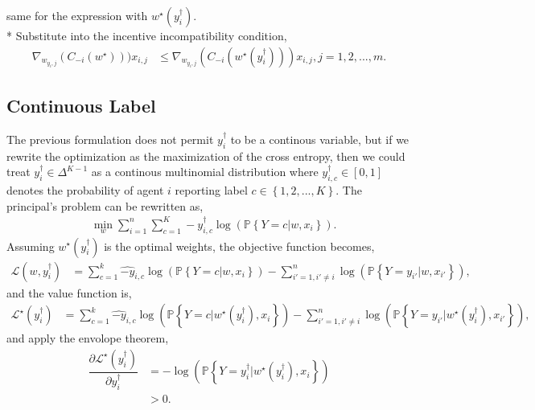 \documentclass{article}
\begin{document}
same for the expression with $w^\star \left(y^{\dagger}_{i}\right)$.
\\* Substitute into the incentive incompatibility condition,
\begin{align*}
\nabla _{w_{y_{i} ,j}} \left(C_{-i}\left(w^\star \right)\right)) x_{i,j} &\leq  \nabla _{w_{y_{i} ,j}} \left(C_{-i}\left(w^\star \left(y^{\dagger}_{i}\right)\right)\right) x_{i,j}, j = 1, 2, ..., m. 
\end{align*}


\subsection{Continuous Label}
The previous formulation does not permit $y^{\dagger}_{i}$ to be a continous variable, but if we rewrite the optimization as the maximization of the cross entropy, then we could treat $y^{\dagger}_{i} \in \Delta^{K-1}$ as a continous multinomial distribution where $y^{\dagger}_{i,c} \in \left[0, 1\right]$ denotes the probability of agent $i $ reporting label $c \in \left\{1, 2, ..., K\right\}$. The principal's problem can be rewritten as,
\begin{align*}
&\displaystyle\min_{w} \displaystyle\sum_{i=1}^{n} \displaystyle\sum_{c=1}^{K} -y^{\dagger}_{i,c} \log\left(\mathbb{P}\left\{Y = c | w, x_{i}\right\}\right).
\end{align*}
Assuming $w^\star \left(y^{\dagger}_{i}\right)$ is the optimal weights, the objective function becomes,
\begin{align*}
\mathcal{L}\left(w, y^{\dagger}_{i}\right) &= \displaystyle\sum_{c=1}^{k} \hat{-y}_{i,c} \log\left(\mathbb{P}\left\{Y = c | w, x_{i}\right\}\right) - \displaystyle\sum_{i' =1, i' \neq  i}^{n} \log\left(\mathbb{P}\left\{Y = y_{i'} | w, x_{i'}\right\}\right),
\end{align*}
and the value function is,
\begin{align*}
\mathcal{L}^\star \left(y^{\dagger}_{i}\right) &= \displaystyle\sum_{c=1}^{k} \hat{-y}_{i,c} \log\left(\mathbb{P}\left\{Y = c | w^\star \left(y^{\dagger}_{i}\right), x_{i}\right\}\right) - \displaystyle\sum_{i' =1, i' \neq  i}^{n} \log\left(\mathbb{P}\left\{Y = y_{i'} | w^\star \left(y^{\dagger}_{i}\right), x_{i'}\right\}\right),
\end{align*}
and apply the envolope theorem,
\begin{align*}
\dfrac{\partial \mathcal{L}^\star \left(y^{\dagger}_{i}\right)}{\partial y^{\dagger}_{i}} &= -\log\left(\mathbb{P}\left\{Y = y^{\dagger}_{i} | w^\star \left(y^{\dagger}_{i}\right), x_{i}\right\}\right)
\\ &> 0.
\end{align*}
\end{document}

